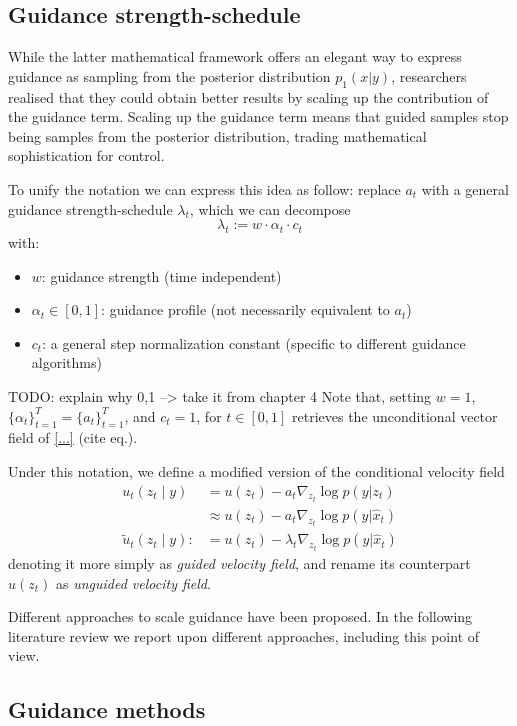 \subsection{Guidance strength-schedule}

While the latter mathematical framework offers an elegant way to express guidance as sampling from the posterior distribution $p_1(x|y)$,
researchers realised that they could obtain better results by scaling up the contribution of the guidance term.
Scaling up the guidance term means that guided samples stop being samples from the posterior distribution, trading mathematical sophistication for control.

To unify the notation we can express this idea as follow: replace $a_t$ with a general guidance strength-schedule $\lambda_t$,
which we can decompose 
\begin{equation}
    \lambda_t := w \cdot \alpha_t \cdot c_t
\end{equation}
with:
\begin{itemize}[noitemsep]
    \item $w$: guidance strength (time independent)
    \item $\alpha_t \in [0,1]$: guidance profile (not necessarily equivalent to $a_t$)
    \item $c_t$: a general step normalization constant (specific to different guidance algorithms)
\end{itemize}
TODO: explain why 0,1 --> take it from chapter 4
Note that, setting $w=1$, $\{\alpha_t\}_{t=1}^T=\{a_t\}_{t=1}^T$, and $c_t=1$, for $t \in [0,1]$ retrieves the unconditional vector field of \ref{...} (cite eq.).

Under this notation, we define a modified version of the conditional velocity field 
\begin{align*}
    u_t(z_t \mid y) &= u(z_t) - a_t \nabla_{z_t} \log p(y|z_t) \\
    &\approx u(z_t) - a_t \nabla_{z_t} \log p(y|\hat{x}_t) \\
    \tilde{u}_t(z_t\mid y) :&= u(z_t) - \lambda_t \nabla_{z_t} \log p(y|\hat{x}_t)
\end{align*}
denoting it more simply as \emph{guided velocity field}, and rename its counterpart $u(z_t)$ as \emph{unguided velocity field}.

Different approaches to scale guidance have been proposed. In the following literature review we report upon different approaches, including this point of view.

\subsection{Guidance methods}

